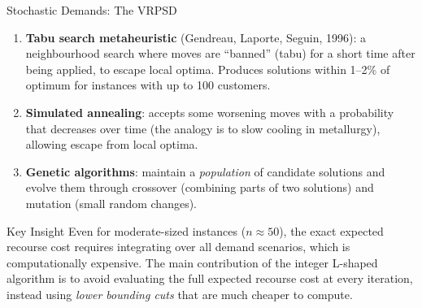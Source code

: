 \documentclass[aspectratio=169,10pt]{beamer}
\begin{document}
\begin{frame}[allowframebreaks]{Stochastic Demands: The VRPSD}
\begin{enumerate}
    \item \textbf{Tabu search metaheuristic} (Gendreau, Laporte, Seguin,
          1996): a neighbourhood search where moves are ``banned'' (tabu)
          for a short time after being applied, to escape local optima.
          Produces solutions within 1--2\% of optimum for instances
          with up to 100 customers.

    \item \textbf{Simulated annealing}: accepts some worsening moves with
          a probability that decreases over time (the analogy is to slow
          cooling in metallurgy), allowing escape from local optima.

    \item \textbf{Genetic algorithms}: maintain a \emph{population} of
          candidate solutions and evolve them through crossover (combining
          parts of two solutions) and mutation (small random changes).
  \end{enumerate}

  \begin{alertblock}{Key Insight}
    Even for moderate-sized instances ($n \approx 50$), the exact expected
    recourse cost requires integrating over all demand scenarios, which is
    computationally expensive.
    The main contribution of the integer L-shaped algorithm is to avoid
    evaluating the full expected recourse cost at every iteration,
    instead using \emph{lower bounding cuts} that are much cheaper to compute.
  \end{alertblock}

\end{frame}
\end{document}
